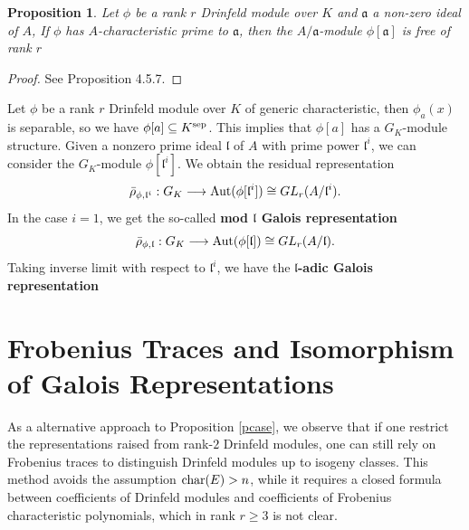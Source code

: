 \documentclass[20pt, oneside]{article}   	%
\newtheorem{prop}[thm]{Proposition}
\theoremstyle{definition}
\newcommand{\fl}{\mathfrak{l}}
\begin{document}
\begin{prop}\label{prop0.2}
Let $\phi$ be a rank $r$ Drinfeld module over $K$ and $\mathfrak{a}$ a non-zero ideal of $A$,
 If $\phi$ has $A$-characteristic prime to $\mathfrak{a}$, then the $A/\mathfrak{a}$-module $\phi[\mathfrak{a}]$ is free of rank $r$
\end{prop}
\begin{proof}
See \cite{G96} Proposition 4.5.7.
\end{proof}

Let $\phi$ be a rank $r$ Drinfeld module over $K$ of generic characteristic, then $\phi_a(x)$ is separable, so we have $\phi[a]\subseteq K^{{\rm{sep}}}$.
This implies that $\phi[a]$ has a $G_K$-module structure. Given a nonzero prime ideal $\fl$ of $A$ with prime power $\fl^i$, we can consider the $G_K$-module $\phi[\mathfrak{l}^i]$. We obtain the residual representation 
$$\bar{\rho}_{\phi,\mathfrak{l}^i}:G_K\longrightarrow {\rm{Aut}}(\phi[\mathfrak{l}^i])\cong GL_r(A/{\mathfrak{l}}^i).$$
In the case $i=1$, we get the so-called \textbf{mod $\mathfrak{l}$ Galois representation}
$$\bar{\rho}_{\phi,\mathfrak{l}}:G_K\longrightarrow {\rm{Aut}}(\phi[\mathfrak{l}])\cong GL_r(A/\fl).$$
Taking inverse limit with respect to $\mathfrak{l}^i$, we have the \textbf{$\mathfrak{l}$-adic Galois representation}



\section{Frobenius Traces and Isomorphism of Galois Representations}
As a alternative approach to Proposition \ref{pcase}, we observe that if one restrict the representations raised from rank-$2$ Drinfeld modules, one can still rely on Frobenius traces to distinguish Drinfeld modules up to isogeny classes. This method avoids the assumption ${\rm char}(E)>n$, while it requires a closed formula between coefficients of Drinfeld modules and coefficients of Frobenius characteristic polynomials, which in rank $r\geqslant 3$ is not clear.
\end{document}
